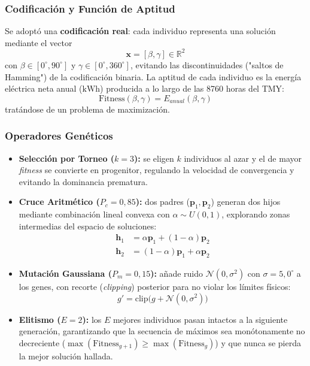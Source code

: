 \documentclass[12pt, a4paper, twocolumn]{article}
\begin{document}
\subsubsection{Codificación y Función de Aptitud}
Se adoptó una \textbf{codificación real}: cada individuo representa una solución mediante el vector
\begin{equation}
\mathbf{x} = [\beta, \gamma] \in \mathbb{R}^2
\end{equation}
con $\beta \in [0^\circ, 90^\circ]$ y $\gamma \in [0^\circ, 360^\circ]$, evitando las discontinuidades ("saltos de Hamming") de la codificación binaria. La aptitud de cada individuo es la energía eléctrica neta anual ($\text{kWh}$) producida a lo largo de las 8760 horas del TMY:
\begin{equation}
\text{Fitness}(\beta, \gamma) = E_{anual}(\beta, \gamma)
\end{equation}
tratándose de un problema de maximización.

\subsubsection{Operadores Genéticos}
\begin{itemize}
    \item \textbf{Selección por Torneo ($k=3$):} se eligen $k$ individuos al azar y el de mayor \textit{fitness} se convierte en progenitor, regulando la velocidad de convergencia y evitando la dominancia prematura.
    \item \textbf{Cruce Aritmético ($P_c = 0,85$):} dos padres ($\mathbf{p}_1, \mathbf{p}_2$) generan dos hijos mediante combinación lineal convexa con $\alpha \sim U(0,1)$, explorando zonas intermedias del espacio de soluciones:
    \begin{equation}
    \begin{aligned}
        \mathbf{h}_1 &= \alpha \mathbf{p}_1 + (1-\alpha)\mathbf{p}_2 \\
        \mathbf{h}_2 &= (1-\alpha)\mathbf{p}_1 + \alpha \mathbf{p}_2
    \end{aligned}
    \end{equation}
    \item \textbf{Mutación Gaussiana ($P_m = 0,15$):} añade ruido $\mathcal{N}(0,\sigma^2)$ con $\sigma=5,0^\circ$ a los genes, con recorte (\textit{clipping}) posterior para no violar los límites físicos:
    \begin{equation}
        g' = \text{clip}\big(g + \mathcal{N}(0, \sigma^2)\big)
    \end{equation}
    \item \textbf{Elitismo ($E=2$):} los $E$ mejores individuos pasan intactos a la siguiente generación, garantizando que la secuencia de máximos sea monótonamente no decreciente ($\max(\text{Fitness}_{g+1}) \ge \max(\text{Fitness}_g)$) y que nunca se pierda la mejor solución hallada.
\end{itemize}
\end{document}

